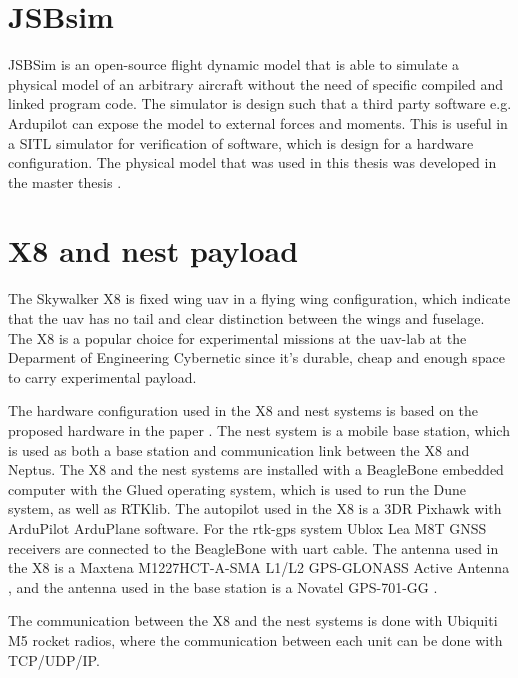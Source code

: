 \section{JSBsim}
JSBSim \citep{berndt2004jsbsim} is an open-source flight dynamic model that is able to simulate a physical model of an arbitrary aircraft without the need of specific compiled and linked program code. The simulator is design such that a third party software e.g. Ardupilot can expose the model to external forces and moments. This is useful in a SITL simulator for verification of software, which is design for a hardware configuration. The physical model that was used in this thesis was developed in the master thesis \citep{Gryte}.
\section{X8 and nest payload}
The Skywalker X8 is fixed wing \gls{uav} in a flying wing configuration, which indicate that the \gls{uav} has no tail and clear distinction between the wings and fuselage. The X8 is a popular choice for experimental missions at the \gls{uav}-lab at the Deparment of Engineering Cybernetic since it's durable, cheap and enough space to carry experimental payload.

The hardware configuration used in the X8 and nest systems is based on the proposed hardware in the paper \citep{zolich2015unmanned}. The nest system is a mobile base station, which is used as both a base station and communication link between the X8 and Neptus. The X8 and the nest systems are installed with a BeagleBone embedded computer with the Glued operating system, which is used to run the Dune system, as well as RTKlib. The autopilot used in the X8 is a 3DR Pixhawk with ArduPilot ArduPlane software. For the \gls{rtk-gps} system Ublox Lea M8T GNSS receivers \citep{UbloxDataSheet,UbloxReceiverDescription} are connected to the BeagleBone with uart cable. The antenna used in the X8 is a Maxtena M1227HCT-A-SMA L1/L2 GPS-GLONASS Active Antenna \citep{maxtena}, and the antenna used in the base station is a Novatel GPS-701-GG \citep{novatel}.

The communication between the X8 and the nest systems is done with Ubiquiti M5 rocket \citep{rocketM5} radios, where the communication between each unit can be done with TCP/UDP/IP.
\cleardoublepage